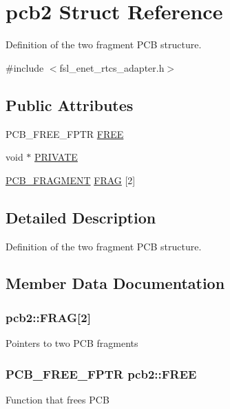\hypertarget{structpcb2}{}\section{pcb2 Struct Reference}
\label{structpcb2}


Definition of the two fragment P\+CB structure.  




{\ttfamily \#include $<$fsl\+\_\+enet\+\_\+rtcs\+\_\+adapter.\+h$>$}

\subsection*{Public Attributes}
\begin{DoxyCompactItemize}
\item 
P\+C\+B\+\_\+\+F\+R\+E\+E\+\_\+\+F\+P\+TR \hyperlink{structpcb2_acd83569194adcc8ebf0b2d946b17a35b}{F\+R\+EE}
\item 
void $\ast$ \hyperlink{structpcb2_a714000014622ace6d632fc74cf117e00}{P\+R\+I\+V\+A\+TE}
\item 
\hyperlink{group__enet__rtcs__adaptor_gab13091728cbbfc60133eca38ad2bbccc}{P\+C\+B\+\_\+\+F\+R\+A\+G\+M\+E\+NT} \hyperlink{structpcb2_abaa92a515af97ca513476effba8d02d6}{F\+R\+AG} \mbox{[}2\mbox{]}
\end{DoxyCompactItemize}


\subsection{Detailed Description}
Definition of the two fragment P\+CB structure. 

\subsection{Member Data Documentation}
\subsubsection[{\texorpdfstring{F\+R\+AG}{FRAG}}]{ pcb2\+::\+F\+R\+AG\mbox{[}2\mbox{]}}\hypertarget{structpcb2_abaa92a515af97ca513476effba8d02d6}{}\label{structpcb2_abaa92a515af97ca513476effba8d02d6}
Pointers to two P\+CB fragments 
\subsubsection[{\texorpdfstring{F\+R\+EE}{FREE}}]{\setlength{\rightskip}{0pt plus 5cm}P\+C\+B\+\_\+\+F\+R\+E\+E\+\_\+\+F\+P\+TR pcb2\+::\+F\+R\+EE}\hypertarget{structpcb2_acd83569194adcc8ebf0b2d946b17a35b}{}\label{structpcb2_acd83569194adcc8ebf0b2d946b17a35b}
Function that frees P\+CB 
